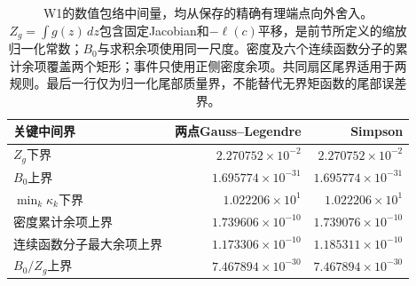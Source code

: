 \begin{table}[htbp]\centering\small
\begin{tabular}{lrr}\toprule
关键中间界 & 两点Gauss--Legendre & Simpson\\\midrule
$Z_g$下界 & $2.270752\times10^{-2}$ & $2.270752\times10^{-2}$\\
$B_0$上界 & $1.695774\times10^{-31}$ & $1.695774\times10^{-31}$\\
$\min_k\kappa_k$下界 & $1.022206\times10^{1}$ & $1.022206\times10^{1}$\\
密度累计余项上界 & $1.739606\times10^{-10}$ & $1.739076\times10^{-10}$\\
连续函数分子最大余项上界 & $1.173306\times10^{-10}$ & $1.185311\times10^{-10}$\\
$B_0/Z_g$上界 & $7.467894\times10^{-30}$ & $7.467894\times10^{-30}$\\
\bottomrule\end{tabular}
\caption{W1的数值包络中间量，均从保存的精确有理端点向外舍入。$Z_g=\int g(z)\,dz$包含固定Jacobian和$-\ell(c)$平移，是前节所定义的缩放归一化常数；$B_0$与求积余项使用同一尺度。密度及六个连续函数分子的累计余项覆盖两个矩形；事件只使用正侧密度余项。共同扇区尾界适用于两规则。最后一行仅为归一化尾部质量界，不能替代无界矩函数的尾部误差界。}
\label{tab:w1-intermediates}\end{table}
